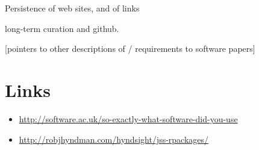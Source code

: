 \documentclass{article}
\begin{document}
Persistence of web sites, and of links

long-term curation and github.

[pointers to other descriptions of / requirements to software papers]



\section{Links}

\begin{itemize}
\item \url{http://software.ac.uk/so-exactly-what-software-did-you-use}
\item \url{http://robjhyndman.com/hyndsight/jss-rpackages/}
\end{itemize}
\end{document}
